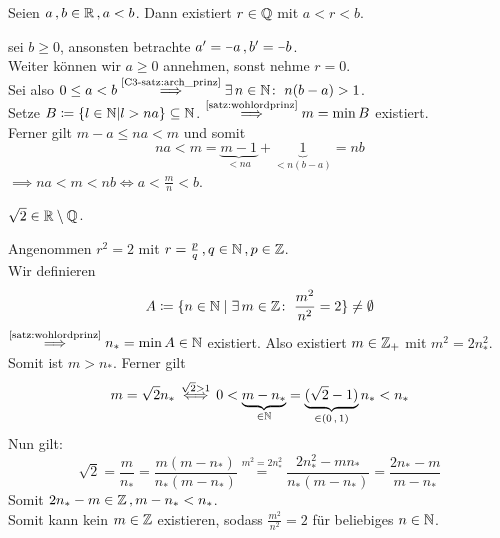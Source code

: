 \documentclass[../ana1.tex]{subfiles}
\begin{document}
\begin{satz}
	Seien \(a \operatorname{,} b \in \mathbb{R} \operatorname{,} a < b \). Dann existiert \( r \in \mathbb{Q} \) mit \(a < r < b \).
\end{satz}
\begin{bew}
	\obda  sei \(b \geq 0 \), ansonsten betrachte \( a^\prime = \minus{a} \ko b^\prime = \minus{b} \). \\
	Weiter können wir \(a \geq 0 \) annehmen, sonst nehme \(r = 0 \). \\
	Sei also \(0 \leq a < b \overset{\text{\autoref{C3-satz:arch_prinz}}}{\implies} \exists \, n \in \N \colon \; n(b-a) > 1 \). \\
	Setze \( B \coloneqq \{ l \in \mathbb{N} \vert l > na \} \subseteq \mathbb{N} \).
	\( \overset{\text{\autoref{satz:wohlordprinz}}}{\implies} m = \min B \) existiert.\\
	Ferner gilt \(m-a \leq na < m \) und somit
	\[ na < m = \underbrace{m-1}_{< na} + \underbrace{1}_{< n(b-a)} = nb \]
	\(\implies na < m  < nb \iff a < \frac{m}{n} < b\).
\end{bew}

\iftoggle{short}{}{\newpage}%

\begin{bem}
	\(\sqrt{2} \in \mathbb{R} \setminus \mathbb{Q} \).
\end{bem}
\begin{bew}
	Angenommen \( r^2 = 2 \) mit \( r = \frac{p}{q} \operatorname{,} q \in \mathbb{N} \operatorname{,} p \in \mathbb{Z} \). \\
	Wir definieren 
	\[A \coloneqq \{n \in \mathbb{N} \; \vert \; \exists \, m \in \mathbb{Z} \colon \; \frac{m^2}{n^2} = 2\} \neq \emptyset \]
	\(\overset{\text{\autoref{satz:wohlordprinz}}}{\implies} n_* = \min A \in \N \) existiert. Also existiert \( m \in \mathbb{Z}_+ \) mit
	\(m^2 = 2n_*^2\). Somit ist \(m > n_* \).
	Ferner gilt
	\[ m= \sqrt{2}n_* \overset{\sqrt{2} > 1}{\iff} 0 < \underbrace{m - n_*}_{\in \mathbb{N}} = \underbrace{(\sqrt{2} - 1)}_{\in (0 \operatorname{,} 1)} n_* < n_* \]
	Nun gilt: 
	\[ \sqrt{2} = \frac{m}{n_*} = \frac{m(m - n_*)}{n_*(m-n_*)} \overset{m^2 = 2n_*^2}{=} \frac{2n_*^2 - mn_*}{n_*(m - n_*)} = \frac{2n_* - m}{m - n_*} \]
	Somit \(2n_* - m \in \mathbb{Z} \operatorname{,} m - n_* < n_* \).  \\
	Somit kann kein \(m \in \mathbb{Z} \) existieren, sodass \(\frac{m^2}{n^2} = 2 \) für beliebiges \(n \in \mathbb{N} \).
\end{bew}
\end{document}
